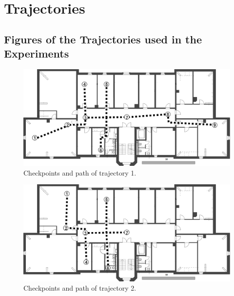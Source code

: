 
\chapter{Trajectories} %

\label{AppendixA} %

\section{Figures of the Trajectories used in the Experiments}

\begin{figure}[th]
\centering
\includegraphics[width=1.0\textwidth]{Figures/trajectory1}
\decoRule
\caption[Trajectory 1]{Checkpoints and path of trajectory 1.}
\label{fig:trajectory1Appendix}
\end{figure}

\begin{figure}[th]
\centering
\includegraphics[width=1.0\textwidth]{Figures/trajectory2}
\decoRule
\caption[Trajectory 2]{Checkpoints and path of trajectory 2.}
\label{fig:trajectory2}
\end{figure}


